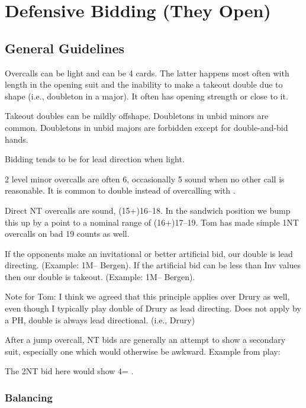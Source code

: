 \documentclass[main]{subfile}
\begin{document}
	
	\chapter{Defensive Bidding (They Open)}
	
	\section{General Guidelines}
	
	Overcalls can be light and can be 4 cards. The latter happens most often with length in the opening suit and the inability to make a takeout double due to shape (i.e., doubleton in a major). It often has opening strength or close to it.
	
	Takeout doubles can be mildly offshape. Doubletons in unbid minors are common. Doubletons in unbid majors are forbidden except for double-and-bid hands.
	
	Bidding tends to be for lead direction when light.
	
	2 level minor overcalls are often 6, occasionally 5 sound when no other call is reasonable. It is common to double instead of overcalling with .
	
	Direct NT overcalls are sound, (15+)16--18. In the sandwich position we bump this up by a point to a nominal range of (16+)17--19. Tom has made simple 1NT overcalls on bad 19 counts as well.
	
	If the opponents make an invitational or better artificial bid, our double is lead directing. (Example: 1M-- Bergen).  If the artificial bid can be less than Inv values then our double is takeout.  (Example: 1M-- Bergen). 
	
	{Note for Tom: I think we agreed that this principle applies over Drury as well, even though I typically play double of Drury as lead directing. }{Does not apply by a PH, double is always lead directional. (i.e., Drury)}
	
	After a jump overcall, NT bids are generally an attempt to show a secondary suit, especially one which would otherwise be awkward.  Example from play:  
	
	
	The 2NT bid here would show 4= \hhh. 
	
	\subsection{Balancing}
	
\end{document}
